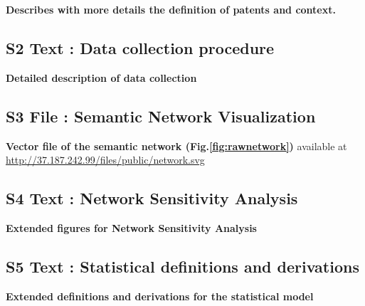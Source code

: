 \documentclass[12pt,twoside,a4paper]{article}
\begin{document}
\textbf{Describes with more details the definition of patents and  context.}

\subsection*{S2 Text : Data collection procedure}

\textbf{Detailed description of data collection}

\subsection*{S3 File : Semantic Network Visualization}

\textbf{Vector file of the semantic network (Fig.\ref{fig:rawnetwork})} available at\\
 \url{http://37.187.242.99/files/public/network.svg}


\subsection*{S4 Text : Network Sensitivity Analysis\label{app:sensitivity}}

\textbf{Extended figures for Network Sensitivity Analysis}

\subsection*{S5 Text : Statistical definitions and derivations}

\textbf{Extended definitions and derivations for the statistical model}









%
%
% 
\end{document}
